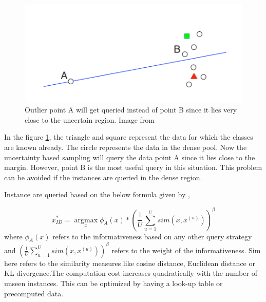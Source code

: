 \begin{figure}[h!]
	\centering
	\includegraphics[scale=0.7]{images/density}
	\caption{Outlier point A will get queried instead of point B since it lies very close to the uncertain region. Image from \cite{Settles2010}}
	\label{weight}
\end{figure}


In the figure \ref{weight}, the triangle and square represent the data for which the classes are known already. The circle represents the data in the dense pool. Now the uncertainty based sampling will query the data point A since it lies close to the margin. However, point B is the most useful query in this situation.  This problem can be avoided if the instances are queried in the dense region.

Instance are queried based on the below formula given by \cite{settles2008analysis},

\begin{equation}  
x^*_{ID} =  \operatorname*{argmax}_x \phi_{A}(x) * (\frac{1}{U} \sum_{u=1}^{U} sim (x,x^{(u)})) ^\beta 
\end{equation} 
where $\phi_{A}(x)$ refers to the informativeness based on any other query strategy and $(\frac{1}{U} \sum_{u=1}^{U} sim (x,x^{(u)})) ^\beta$  refers to the weight of the informativeness. Sim here refers to the similarity measures like cosine distance, Euclidean distance or KL divergence.The computation cost increases quadratically with the number of unseen instances. This can be optimized by having a look-up table or precomputed data. \cite{settles2008analysis} \cite{Settles2010}


 